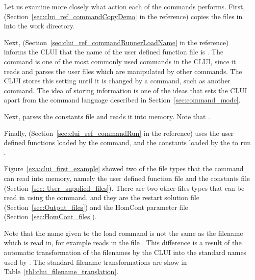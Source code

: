 Let us examine more closely what action each of the commands 
performs.  First,  
(Section~\ref{sec:clui_ref_commandCopyDemo} in the reference) copies the files in 
 into the work directory.  

Next,  
(Section~\ref{sec:clui_ref_commandRunnerLoadName} in the reference)
informs the \AUTOc CLUI that the name of
the user defined function file is .  The command
 is one of the most commonly used commands in the
\AUTOc CLUI, since it reads and parses the user files which are
manipulated by other commands.  The \AUTOc CLUI stores this setting
until it is changed by a command, such as another 
command.  The idea of storing information is one of the ideas that
sets the CLUI apart from the command language described in
Section~\ref{sec:command_mode}.

Next,  parses the \AUTO
constants file  and reads it into memory.  Note that
.  

Finally,  
(Section~\ref{sec:clui_ref_commandRun} in the reference)
uses the user defined functions loaded
by the  command, and the \AUTO constants
loaded by the  to run \AUTOc.

Figure~\ref{exa:clui_first_example} showed two of 
the file types that the 
 command can read into memory, namely 
the user defined function file and the \AUTO constants
file (Section~\ref{sec: User_supplied_files}).  
There are two other files types that can be read
in using the  command, and they are
the restart solution file (Section~\ref{sec:Output_files})
and the {\cal HomCont} parameter
file (Section~\ref{sec:HomCont_files}).

Note that the name given to the load
command is not the same as the filename which is read
in, for example  reads in 
the file .  This difference is 
a result of the automatic transformation of the
filenames by the 
\AUTOc CLUI into the
standard names used by \AUTOc.  
The standard filename
transformations are show in Table~\ref{tbl:clui_filename_translation}. 

